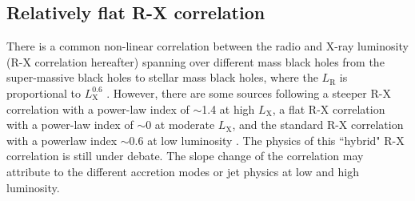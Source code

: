 \documentclass[twocolumn]{aastex63}
\begin{document}
\subsection{Relatively flat R-X correlation}
There is a common non-linear correlation between the radio and X-ray luminosity (R-X correlation hereafter) spanning over different mass black holes from the super-massive black holes to stellar mass black holes, where the $L_\mathrm{R}$ is proportional to $L_\mathrm{X}^{0.6}$ \citep{2003MNRAS.345.1057M,2004A&A...414..895F}. However, there are some sources following a steeper R-X correlation with a power-law index of $\sim$1.4 at high $L_\mathrm{X}$, a flat R-X correlation with a power-law index of  $\sim$0 at moderate $L_\mathrm{X}$, and the standard R-X correlation with a powerlaw index $\sim$0.6 at low luminosity \cite[e.g.][]{2011MNRAS.414..677C,2014ApJ...788...52C,2016MNRAS.463.2287X}. The physics of this ``hybrid" R-X correlation is still under debate. The slope change of the correlation may attribute to the different accretion modes or jet physics at low and high luminosity\citep{2016MNRAS.456.4377X,2018MNRAS.481.4513I,2018MNRAS.473.4122E}. 
\end{document}
